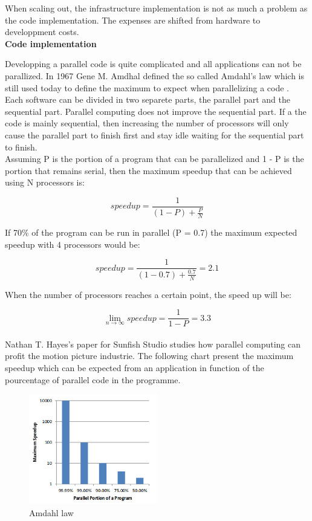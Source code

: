 When scaling out, the infrastructure implementation is not as much a problem as
the code implementation. The expenses are shifted from hardware to developpment
costs.\\

\textbf{Code implementation}

Developping a parallel code is quite complicated and all applications can not
be parallized. In 1967 Gene M. Amdhal defined the so called Amdahl's law which
is still used today to define the maximum to expect when parallelizing a code
\citep{Reference10}. \\

Each software can be divided in two separete parts, the parallel part and the
sequential part. Parallel computing does not improve the sequential part. If a
the code is mainly sequential, then increasing the number of processors will
only cause the parallel part to finish first and stay idle waiting for the
sequential part to finish.\\ 

Assuming P is the portion of a program that can be parallelized and 1 - P  is
the portion that remains serial, then the maximum speedup that can be achieved
using N processors is: 

$$speedup = \frac{1}{(1-P) + \frac{P}{N}} $$

If 70\% of the program can be run in parallel (P = 0.7) the maximum expected
speedup with 4 processors would be:

$$speedup = \frac{1}{(1-0.7) + \frac{0.7}{N}} = 2.1$$

When the number of processors reaches a certain point, the speed up will be:


$$\lim\limits_{n \to \infty} speedup= \frac{1}{1-P} = 3.3$$\\


Nathan T. Hayes's paper for Sunfish Studio \citep{Reference8} studies how
parallel computing can profit the motion picture industrie. The following chart
present the maximum speedup which can be expected from an application in
function of the pourcentage of parallel code in the programme.\\

\begin{figure}[H] 
  \centering
  \includegraphics[width=0.5\textwidth]{./Figures/amdahl.png}
  \caption[Amdahl law]{Amdahl law \citep{Reference8}} 
  \label{fig:amdahl} 
\end{figure}

